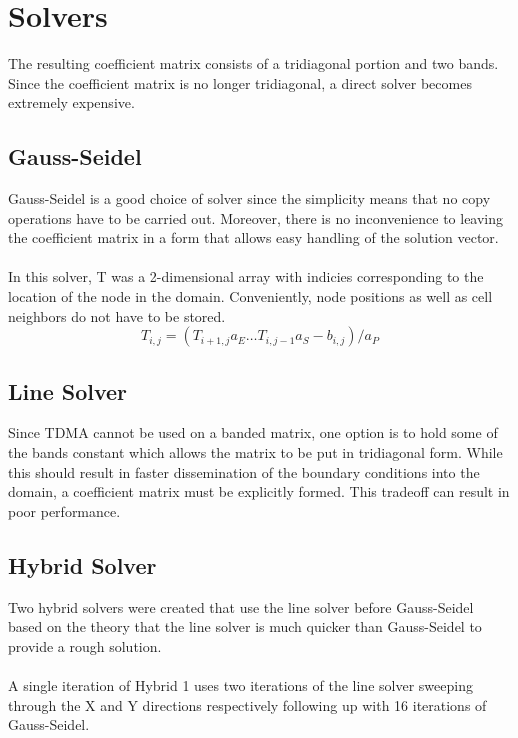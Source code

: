 \documentclass[12pt,twocolumn]{article}
\begin{document}
\section*{Solvers}
The resulting coefficient matrix consists of a tridiagonal portion and two bands. Since the coefficient matrix is no longer tridiagonal, a direct solver becomes extremely expensive.

\subsection*{Gauss-Seidel}
Gauss-Seidel is a good choice of solver since the simplicity means that no copy operations have to be carried out. 
Moreover, there is no inconvenience to leaving the coefficient matrix in a form that allows easy handling of the solution vector.
\paragraph{}
In this solver, T was a 2-dimensional array with indicies corresponding to the location of the node in the domain. 
Conveniently, node positions as well as cell neighbors do not have to be stored.
\begin{equation}T_{i,j} =( T_{i+1,j}a_E \dots T_{i,j-1}a_S - b_{i,j})/a_P\end{equation}
\subsection*{Line Solver}
Since TDMA cannot be used on a banded matrix, one option is to hold some of the bands constant which allows the matrix to be put in tridiagonal form.
While this should result in faster dissemination of the boundary conditions into the domain, a coefficient matrix must be explicitly formed. 
This tradeoff can result in poor performance.
\subsection*{Hybrid Solver}
Two hybrid solvers were created that use the line solver before Gauss-Seidel based on the theory that the line solver is 
much quicker than Gauss-Seidel to provide a rough solution.
\paragraph{}A single iteration of Hybrid 1 uses two iterations of the line solver sweeping through the X and Y directions respectively following up with 16 iterations of Gauss-Seidel.
\end{document}
